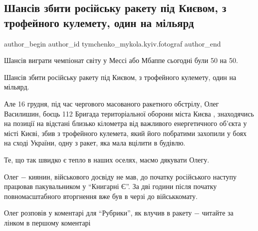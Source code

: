  
 
 
 
 
 
\subsection{Шансів збити російську ракету під Києвом, з трофейного кулемету, один на мільярд}
\label{sec:18_12_2022.fb.tymchenko_mykola.kyiv.fotograf.1.zbyty_raketu}
 
\ifcmt
 author_begin
   author_id tymchenko_mykola.kyiv.fotograf
 author_end
\fi

Шансів виграти чемпіонат світу у Мессі або Мбаппе сьогодні були 50 на 50.

Шансів збити російську ракету під Києвом, з трофейного кулемету, один на
мільярд.

Але 16 грудня, під час чергового масованого ракетного обстрілу, Олег Василишин,
боєць 112 Бригада територіальної оборони міста Києва , знаходячись на позиції
на відстані близько кілометра від важливого енергетичного об’єкта у місті
Києві, збив з трофейного кулемета, який його побратими захопили у боях на сході
України, одну з ракет, яка мала вцілити в будівлю.

Те, що так швидко є тепло в наших оселях, маємо дякувати Олегу.

Олег − киянин, військового досвіду не мав, до початку російського наступу
працював пакувальником у \enquote{Книгарні Є}. За дві години після початку
повномасштабного вторгнення вже був в черзі до військкомату.

Олег розповів у коментарі для \enquote{Рубрики}, як влучив в ракету − читайте за лінком
в першому коментарі
